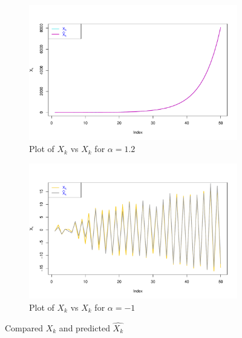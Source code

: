 \documentclass[a4paper, 11pt]{article}
\begin{document}
{\begin{enumerate}[label=(\alph*)]
\begin{figure}[hbt!]
	\medskip %
	\begin{subfigure}{.475\linewidth}
		\includegraphics[width=\linewidth]{./ass5.2b-1.2.pdf}
		\caption{Plot of $X_k$ vs $\hat{X}_k$ for $\alpha=1.2$}
		\label{velcomp}
	\end{subfigure}\hfill %
	\begin{subfigure}{.475\linewidth}
		\includegraphics[width=\linewidth]{./ass5.2b--1.pdf}
		\caption{Plot of $X_k$ vs $\hat{X}_k$ for $\alpha=-1$}
		\label{estcomp}
	\end{subfigure}
	
	\caption{Compared $X_k$ and predicted $\hat{X_k}$}
	\label{fig:roc}
\end{figure}




\end{enumerate}}
\end{document}

